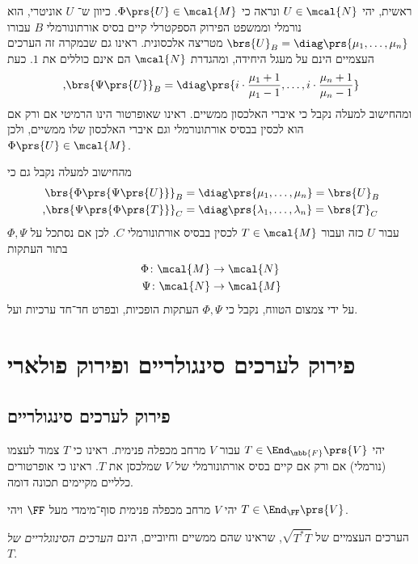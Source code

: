\documentclass[a4paper,10pt,twoside,openany]{book}
\begin{document}
\begin{solution}
\begin{enumerate}
ראשית, יהי
$U \in \mcal{N}$
ונראה כי
$\Phi\prs{U} \in \mcal{M}$.
כיוון ש־%
$U$
אוניטרי, הוא נורמלי וממשפט הפירוק הספקטרלי קיים בסיס אורתונורמלי
$B$
עבורו
$\brs{U}_B = \diag\prs{\mu_1, \ldots, \mu_n}$
מטריצה אלכסונית. ראינו גם שבמקרה זה הערכים העצמיים הינם על מעגל היחידה, ומהגדרת
$\mcal{N}$
הם אינם כוללים את
$1$.
כעת
\[\text{,} \brs{\Psi\prs{U}}_B = \diag\prs{i \cdot \frac{\mu_1 + 1}{\mu_1 - 1}, \ldots, i \cdot \frac{\mu_n + 1}{\mu_n - 1}}\]
ומהחישוב למעלה נקבל כי איברי האלכסון ממשיים. ראינו שאופרטור הינו הרמיטי אם ורק אם הוא לכסין בבסיס אורתונורמלי וגם איברי האלכסון שלו ממשיים, ולכן
$\Phi\prs{U} \in \mcal{M}$.

מהחישוב למעלה נקבל גם כי
\begin{align*}
\brs{\Phi\prs{\Psi\prs{U}}}_B &= \diag\prs{\mu_1, \ldots, \mu_n} = \brs{U}_B \\
\text{,} \brs{\Psi \prs{\Phi\prs{T}}}_C &= \diag\prs{\lambda_1, \ldots, \lambda_n} = \brs{T}_C 
\end{align*}
עבור
$U$
כזה ועבור
$T \in \mcal{M}$
לכסין בבסיס אורתונורמלי
$C$.
לכן אם נסתכל על
$\Phi, \Psi$
בתור העתקות
\begin{align*}
\Phi \colon \mcal{M} &\to \mcal{N} \\
\Psi \colon \mcal{N} &\to \mcal{M}
\end{align*}
על ידי צמצום הטווח, נקבל כי
$\Phi, \Psi$
העתקות הופכיות, ובפרט חד־חד ערכיות ועל.
\end{enumerate}
\end{solution}

\section{פירוק לערכים סינגולריים ופירוק פולארי}

\subsection{פירוק לערכים סינגולריים}

יהי
$T \in \End_\mbb{F}\prs{V}$
עבור
$V$
מרחב מכפלה פנימית. ראינו כי
$T$
צמוד לעצמו (נורמלי) אם ורק אם קיים בסיס אורתונורמלי של
$V$
שמלכסן את
$T$.
ראינו כי אופרטורים כלליים מקיימים תכונה דומה.

\begin{definition}
יהי
$V$
מרחב מכפלה פנימית סוף־מימדי מעל
$\FF$
ויהי
$T \in \End_\FF\prs{V}$.

הערכים העצמיים של
$\sqrt{T^* T}$,
שראינו שהם ממשיים וחיוביים, הינם
\emph{הערכים הסינוגלריים של
$T$}.
\end{definition}
\end{document}
